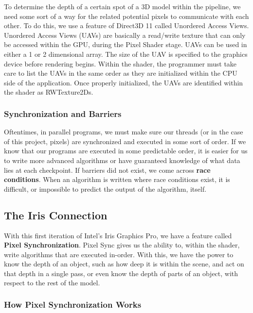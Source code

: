 \documentclass[a4paper, 12pt]{article}
\begin{document}
To determine the depth of a certain spot of a 3D model within the pipeline, we
need some sort of a way for the related potential pixels to communicate with
each other. To do this, we use a feature of Direct3D 11 called Unordered
Access Views. Unordered Access Views (UAVs) are basically a read/write texture
that can only be accessed within the GPU, during the Pixel Shader stage. UAVs
can be used in either a 1 or 2 dimensional array. The size of the UAV is
specified to the graphics device before rendering begins. Within the shader,
the programmer must take care to list the UAVs in the same order as they are
initialized within the CPU side of the application. Once properly initialized,
the UAVs are identified within the shader as RWTexture2Ds.

\subsubsection{Synchronization and Barriers}

Oftentimes, in parallel programs, we must make sure our threads (or in the
case of this project, pixels) are synchronized and executed in some sort of
order. If we know that our programs are executed in some predictable order, it
is easier for us to write more advanced algorithms or have guaranteed
knowledge of what data lies at each checkpoint. If barriers did not exist, we
come across \textbf{race conditions}. When an algorithm is written where race
conditions exist, it is difficult, or impossible to predict the output of the
algorithm, itself.

\subsection{The Iris Connection}

With this first iteration of Intel's Iris Graphics Pro, we have a feature
called \textbf{Pixel Synchronization}. Pixel Sync gives us the ability to,
within the shader, write algorithms that are executed in-order. With this, we
have the power to know the depth of an object, such as how deep it is within
the scene, and act on that depth in a single pass, or even know the depth of
parts of an object, with respect to the rest of the model.

\subsubsection{How Pixel Synchronization Works}
\end{document}
